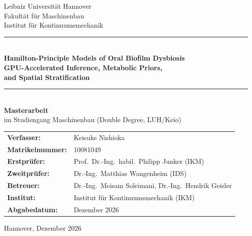 \documentclass[12pt, a4paper, twoside]{report}
\begin{document}
\begin{titlepage}
  \centering
  \vspace*{2cm}
  {\Large Leibniz Universität Hannover\\[4pt]
         Fakultät für Maschinenbau\\[4pt]
         Institut für Kontinuumsmechanik}\\[2cm]

  \rule{\textwidth}{1.5pt}\\[0.4cm]
  {\LARGE\bfseries Hamilton-Principle Models of Oral Biofilm Dysbiosis}\\[8pt]
  {\large\bfseries GPU-Accelerated Inference, Metabolic Priors,\\[2pt]
   and Spatial Stratification}\\[0.4cm]
  \rule{\textwidth}{1.5pt}\\[1.5cm]

  {\large\bfseries Masterarbeit}\\[0.5cm]
  {\large im Studiengang Maschinenbau (Double Degree, LUH/Keio)}\\[2cm]

  \begin{tabular}{ll}
    \textbf{Verfasser:}       & Keisuke Nishioka \\
    \textbf{Matrikelnummer:}  & 10081049 \\
    \textbf{Erstprüfer:}      & Prof.\ Dr.-Ing.\ habil.\ Philipp Junker (IKM) \\
    \textbf{Zweitprüfer:}     & Dr.-Ing.\ Matthias Wangenheim (IDS) \\
    \textbf{Betreuer:}        & Dr.-Ing.\ Meisam Soleimani, Dr.-Ing.\ Hendrik Geisler \\
    \textbf{Institut:}        & Institut für Kontinuumsmechanik (IKM) \\
    \textbf{Abgabedatum:}     & Dezember 2026 \\
  \end{tabular}

  \vfill
  {\small Hannover, Dezember 2026}
\end{titlepage}

\end{document}
